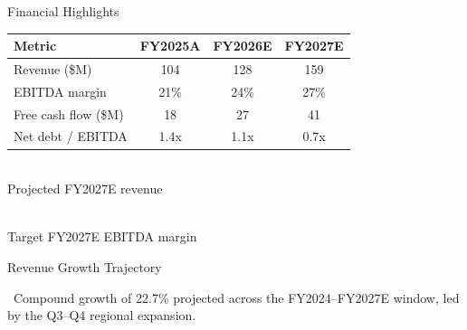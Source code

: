 \documentclass[style=ciment]{powerdot}
\begin{document}
\begin{slide}{Financial Highlights}
\begin{center}
\renewcommand{\arraystretch}{1.25}
\begin{tabular}{@{}lccc@{}}
\toprule
\rowcolor{merilight}
\textbf{Metric} & \textbf{FY2025A} & \textbf{FY2026E} & \textbf{FY2027E} \\
\midrule
Revenue (\$M) & 104 & 128 & 159 \\
EBITDA margin & 21\% & 24\% & 27\% \\
Free cash flow (\$M) & 18 & 27 & 41 \\
Net debt / EBITDA & 1.4x & 1.1x & 0.7x \\
\bottomrule
\end{tabular}
\end{center}
\vspace{0.4cm}
\begin{minipage}[t]{0.48\linewidth}
\begin{tcolorbox}[statbox]
\\
{\small\textcolor{merislate}{Projected FY2027E revenue}}
\end{tcolorbox}
\end{minipage}\hfill
\begin{minipage}[t]{0.48\linewidth}
\begin{tcolorbox}[statbox]
\\
{\small\textcolor{merislate}{Target FY2027E EBITDA margin}}
\end{tcolorbox}
\end{minipage}
\end{slide}

\begin{slide}{Revenue Growth Trajectory}
\begin{center}
\end{center}
\vspace{0.4cm}
{\small\textcolor{merislate}{\faChartLine\ Compound growth of 22.7\% projected across the FY2024--FY2027E window, led by the Q3--Q4 regional expansion.}}
\end{slide}
\end{document}
